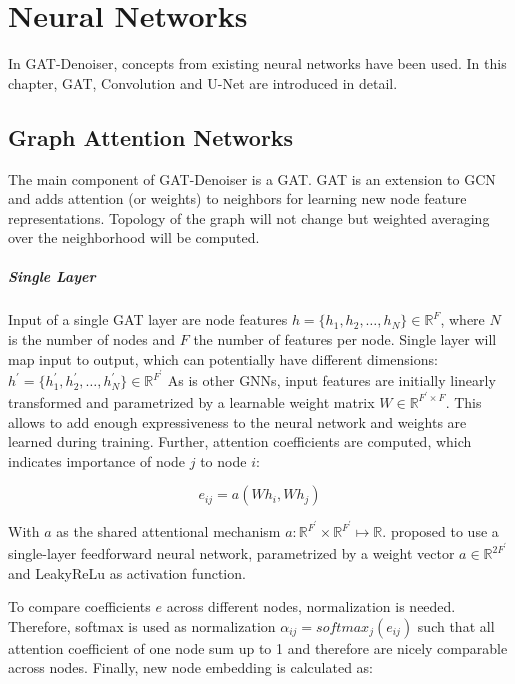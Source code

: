 \chapter{Neural Networks}
\label{sec:neural_networks}
In GAT-Denoiser, concepts from existing neural networks have been used.
In this chapter, GAT, Convolution and U-Net are introduced in detail.

\section{Graph Attention Networks}
The main component of GAT-Denoiser is a GAT.
GAT is an extension to GCN and adds attention (or weights) to neighbors for learning new node feature representations. 
Topology of the graph will not change but weighted averaging over the neighborhood will be computed.

\paragraph{Single Layer}
Input of a single GAT layer are node features $h = \{ h_1, h_2, \dots , h_N \} \in \mathbb{R}^F$, 
where $N$ is the number of nodes and $F$ the number of features per node. 
Single layer will map input to output, which can potentially have different dimensions: 
$h^{\prime} = \{ h_1^{\prime}, h_2^{\prime}, \dots, h_N^{\prime} \} \in \mathbb{R}^{F^{\prime}} $
As is other GNNs, input features are initially linearly transformed and parametrized by a learnable weight matrix 
$W \in \mathbb{R}^{F^{\prime} \times F}$. 
This allows to add enough expressiveness to the neural network and weights are learned during training.
Further, attention coefficients are computed, which indicates importance of node $j$ to node $i$:

\begin{equation}
  e_{ij} = a(Wh_i, Wh_j)
\end{equation}

With $a$ as the shared attentional mechanism $a : \mathbb{R}^{F^{\prime}} \times \mathbb{R}^{F^{\prime}} \mapsto \mathbb{R}$.
\citet{GAT} proposed to use a single-layer feedforward neural network, parametrized by a weight vector $a \in \mathbb{R}^{2F^{\prime}}$
and LeakyReLu as activation function.

To compare coefficients $e$ across different nodes, normalization is needed.
Therefore, softmax is used as normalization $\alpha_{ij} = softmax_j(e_{ij})$ 
such that all attention coefficient of one node sum up to 1 and therefore are nicely comparable across nodes.
Finally, new node embedding is calculated as:


